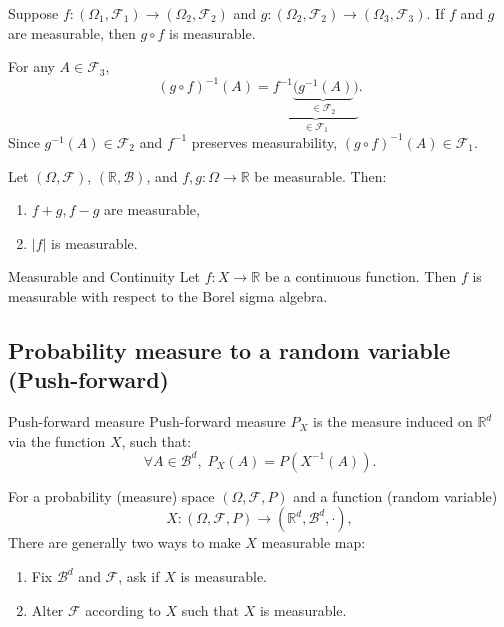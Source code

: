\begin{eg}{}
\noindent Suppose \( f: (\Omega_1,\mathscr{F}_1)  \to (\Omega_2, \mathscr{F}_2) \) and \( g: (\Omega_2, \mathscr{F}_2) \to (\Omega_3, \mathscr{F}_3) \). If \( f \) and \( g \) are measurable, then \( g \circ f \) is measurable.

\noindent For any \( A \in \mathscr{F}_3 \),
\[
(g \circ f)^{-1}(A) = \underbrace{f^{-1}\underbrace{(g^{-1}(A)}_{\in \mathscr{F}_2})}_{\in\mathscr{F}_1}.
\]
Since \( g^{-1}(A) \in \mathscr{F}_2 \) and \( f^{-1} \) preserves measurability, \( (g \circ f)^{-1}(A) \in \mathscr{F}_1 \).
\end{eg}


\begin{prop}
\noindent Let \( (\Omega, \mathscr{F}) \), \( (\mathbb{R}, \mathscr{B}) \), and \( f, g: \Omega \to \mathbb{R} \) be measurable. Then:
\begin{enumerate}
    \item \( f+g, f-g \) are measurable,
    \item \( |f| \) is measurable.
\end{enumerate}	
\end{prop}

\begin{prop}{Measurable and Continuity}
\noindent Let \( f: X \to \mathbb{R} \) be a continuous function. Then \( f \) is measurable with respect to the Borel sigma algebra.
\end{prop}

\subsection{Probability measure to a random variable (Push-forward)}

\begin{df}{Push-forward measure}
Push-forward measure \( P_X \) is the measure induced on \( \mathbb{R}^d \) via the function \( X \), such that:
\[
\forall A \in \mathscr{B}^d, \; P_X(A) = P(X^{-1}(A)).
\]
\end{df}

\noindent For a probability (measure) space \((\Omega, \mathscr{F}, P)\) and a function (random variable) 
\[
X: (\Omega, \mathscr{F}, P) \to (\mathbb{R}^d, \mathscr{B}^d, \cdot),
\]
There are generally two ways to make $X$ measurable map: 
\begin{enumerate}
	\item Fix $\mathscr{B}^d$ and $\mathscr{F}$, ask if $X$ is measurable. 
	\item Alter $\mathscr{F}$ according to $X$ such that $X$ is measurable. 
\end{enumerate}

